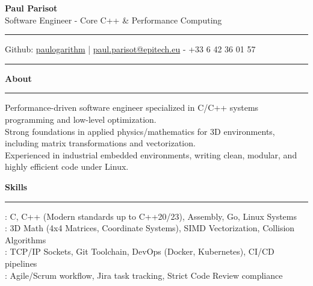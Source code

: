 \documentclass[9pt]{extarticle}
\begin{document}
\begin{center}
    {\huge\bfseries Paul Parisot}
    \\[10pt]
    {\Large Software Engineer - Core C++ \& Performance Computing}
    \\
\end{center}

\par\vspace{-10pt}
\rule{\linewidth}{0.4pt}
\par\vspace{-10pt}

\begin{center}
    Github: \href{https://github.com/paulogarithm}{paulogarithm} 
    \quad | \quad 
    \href{mailto:paul.parisot@epitech.eu}{paul.parisot@epitech.eu} - +33 6 42 36 01 57
\end{center}

\par\vspace{-15pt}
\rule{\linewidth}{0.4pt}
\par\vspace{5pt}

{\large\bfseries About}
\par\vspace{-8pt}
\rule{\linewidth}{0.4pt}
\par\vspace{5pt}

Performance-driven software engineer specialized in C/C++ systems programming and low-level optimization. \\
Strong foundations in applied physics/mathematics for 3D environments, including matrix transformations and vectorization. \\
Experienced in industrial embedded environments, writing clean, modular, and highly efficient code under Linux.

\par\vspace{5pt}

{\large\bfseries Skills}
\par\vspace{-8pt}
\rule{\linewidth}{0.4pt}
\par\vspace{5pt}

\hspace*{5pt}{\bfseries Technical Expertise}: C, C++ (Modern standards up to C++20/23), Assembly, Go, Linux Systems \\
\hspace*{5pt}{\bfseries Math \& Optimization}: 3D Math (4x4 Matrices, Coordinate Systems), SIMD Vectorization, Collision Algorithms \\
\hspace*{5pt}{\bfseries Protocols \& Tooling}: TCP/IP Sockets, Git Toolchain, DevOps (Docker, Kubernetes), CI/CD pipelines \\
\hspace*{5pt}{\bfseries Methodology}: Agile/Scrum workflow, Jira task tracking, Strict Code Review compliance
\end{document}
